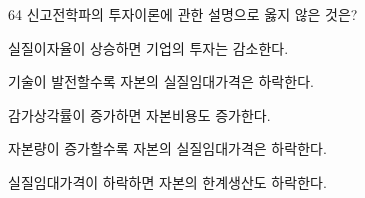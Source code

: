 \begin{question}{64}
신고전학파의 투자이론에 관한 설명으로 옳지 않은 것은?
\begin{choices}
  \item 실질이자율이 상승하면 기업의 투자는 감소한다.
  \item 기술이 발전할수록 자본의 실질임대가격은 하락한다.
  \item 감가상각률이 증가하면 자본비용도 증가한다.
  \item 자본량이 증가할수록 자본의 실질임대가격은 하락한다.
  \item 실질임대가격이 하락하면 자본의 한계생산도 하락한다.
\end{choices}
\end{question}
